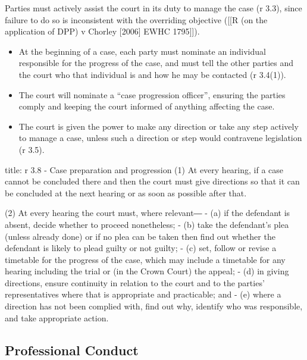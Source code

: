 \documentclass[
]{article}
\newenvironment{Shaded}{}{}
\newcommand{\NormalTok}[1]{#1}
\providecommand{\tightlist}{%
  \setlength{\itemsep}{0pt}\setlength{\parskip}{0pt}}
\begin{document}
Parties must actively assist the court in its duty to manage the case (r
3.3), since failure to do so is inconsistent with the overriding
objective ({[}{[}R (on the application of DPP) v Chorley {[}2006{]} EWHC
1795{]}{]}).

\begin{itemize}
\tightlist
\item
  At the beginning of a case, each party must nominate an individual
  responsible for the progress of the case, and must tell the other
  parties and the court who that individual is and how he may be
  contacted (r 3.4(1)).
\item
  The court will nominate a ``case progression officer'', ensuring the
  parties comply and keeping the court informed of anything affecting
  the case.
\item
  The court is given the power to make any direction or take any step
  actively to manage a case, unless such a direction or step would
  contravene legislation (r 3.5).
\end{itemize}

\begin{Shaded}
\begin{Highlighting}[]
\NormalTok{title: r 3.8 {-} Case preparation and progression}
\NormalTok{(1) At every hearing, if a case cannot be concluded there and then the court must give directions so that it can be concluded at the next hearing or as soon as possible after that.}

\NormalTok{(2) At every hearing the court must, where relevant―}
\NormalTok{{-} (a) if the defendant is absent, decide whether to proceed nonetheless;}
\NormalTok{{-} (b) take the defendant’s plea (unless already done) or if no plea can be taken then find out whether the defendant is likely to plead guilty or not guilty;}
\NormalTok{{-} (c) set, follow or revise a timetable for the progress of the case, which may include a timetable for any hearing including the trial or (in the Crown Court) the appeal;}
\NormalTok{{-} (d) in giving directions, ensure continuity in relation to the court and to the parties’ representatives where that is appropriate and practicable; and}
\NormalTok{{-} (e) where a direction has not been complied with, find out why, identify who was responsible, and take appropriate action. }
\end{Highlighting}
\end{Shaded}

\hypertarget{professional-conduct}{%
\subsection{Professional Conduct}\label{professional-conduct}}
\end{document}
